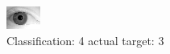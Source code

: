\begin{figure}[h!]
\begin{center}
\includegraphics[width=0.60\columnwidth]{figures/ID2056_class_4_target_3.png}
\end{center}
\caption{ Classification: 4 actual target: 3}
\label{fig:ID2056_class_4_target_3}
\end{figure}
